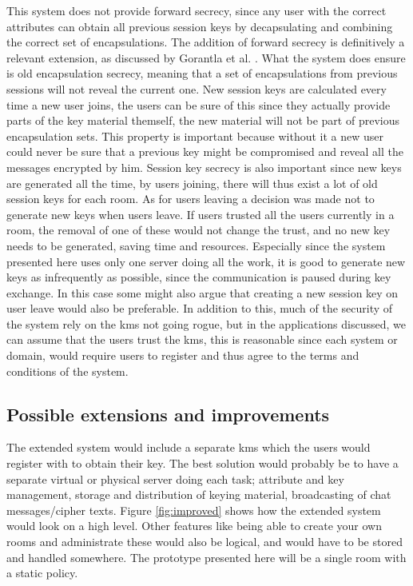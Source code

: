 This system does not provide forward secrecy, since any user with the correct attributes can obtain all previous session keys by decapsulating and combining the correct set of encapsulations. The addition of forward secrecy is definitively a relevant extension, as discussed by Gorantla et al. \cite{gorantla2010attribute}. What the system does ensure is old encapsulation secrecy, meaning that a set of encapsulations from previous sessions will not reveal the current one. New session keys are calculated every time a new user joins, the users can be sure of this since they actually provide parts of the key material themself, the new material will not be part of previous encapsulation sets. This property is important because without it a new user could never be sure that a previous key might be compromised and reveal all the messages encrypted by him. Session key secrecy is also important since new keys are generated all the time, by users joining, there will thus exist a lot of old session keys for each room. As for users leaving a decision was made not to generate new keys when users leave. If users trusted all the users currently in a room, the removal of one of these would not change the trust, and no new key needs to be generated, saving time and resources. Especially since the system presented here uses only one server doing all the work, it is good to generate new keys as infrequently as possible, since the communication is paused during key exchange. In this case some might also argue that creating a new session key on user leave would also be preferable. In addition to this, much of the security of the system rely on the \gls{kms} not going rogue, but in the applications discussed, we can assume that the users trust the \gls{kms}, this is reasonable since each system or domain, would require users to register and thus agree to the terms and conditions of the system.



\subsection{Possible extensions and improvements}
The extended system would include a separate \gls{kms} which the users would register with to obtain their key. The best solution would probably be to have a separate virtual or physical server doing each task; attribute and key management, storage and distribution of keying material, broadcasting of chat messages/cipher texts. Figure \ref{fig:improved} shows how the extended system would look on a high level. Other features like being able to create your own rooms and administrate these would also be logical, and would have to be stored and handled somewhere. The prototype presented here will be a single room with a static policy.

